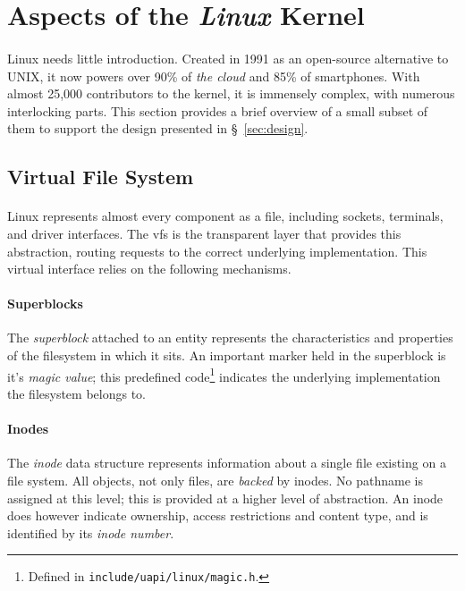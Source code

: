 
\section{Aspects of the \textit{Linux} Kernel}

\paragraph{} Linux needs little introduction. Created in 1991 as an open-source alternative to UNIX, it now powers over 90\% of \textit{the cloud} and 85\% of smartphones. With almost 25,000 contributors to the kernel, it is immensely complex, with numerous interlocking parts. This section provides a brief overview of a small subset of them to support the design presented in §~\ref{sec:design}.

\subsection{Virtual File System}

\paragraph{} Linux represents almost every component as a file, including sockets, terminals, and driver interfaces. The \acrshort{vfs} is the transparent layer that provides this abstraction, routing requests to the correct underlying implementation. This virtual interface relies on the following mechanisms.

\paragraph{Superblocks} The \textit{superblock} attached to an entity represents the characteristics and properties of the filesystem in which it sits. An important marker held in the superblock is it's \textit{magic value}; this predefined code\footnote{Defined in \texttt{include/uapi/linux/magic.h}.} indicates the underlying implementation the filesystem belongs to.

\paragraph{Inodes} The \textit{inode} data structure represents information about a single file existing on a file system. All objects, not only files, are \textit{backed} by inodes. No pathname is assigned at this level; this is provided at a higher level of abstraction. An inode does however indicate ownership, access restrictions and content type, and is identified by its \textit{inode number}.


